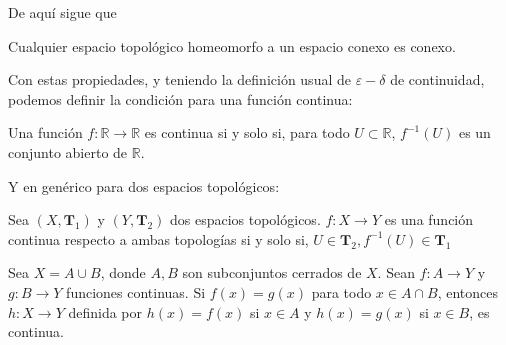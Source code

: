 \documentclass{../Topologia.tex}
\begin{document}
De aquí sigue que
\begin{teorema}

	Cualquier espacio topológico homeomorfo a un espacio conexo es conexo.

\end{teorema}
Con estas propiedades, y teniendo la definición usual de $\varepsilon-\delta$ de continuidad, podemos definir la condición para una función continua:
\begin{teorema}

	Una función $f:\mathbb{R} \to \mathbb{R}$ es continua si y solo si, para todo $U \subset \mathbb{R}$, $f^{-1}(U)$ es un conjunto abierto de $\mathbb{R}$.       

\end{teorema}
Y en genérico para dos espacios topológicos:
\begin{teorema}

	Sea $(X, \mathbf{T}_{1})$ y $(Y,\mathbf{T}_{2})$ dos espacios topológicos. $f:X \to Y$ es una función continua respecto a ambas topologías si y solo si,
	$U \in \mathbf{T}_{2}, f^{-1}(U) \in \mathbf{T}_{1}$ 

\end{teorema}
\begin{teorema}

	Sea $X = A \cup B$, donde $A,B$ son subconjuntos cerrados de $X$. Sean $f:A \to Y$ y $g:B \to Y$ funciones continuas. Si $f(x)=g(x)$ para todo $x \in A \cap B$, entonces $h:X \to Y$ definida por $h(x)=f(x)$ si $x \in A$ y $h(x)=g(x)$ si $x \in B$, es continua.             

\end{teorema}
\end{document}
